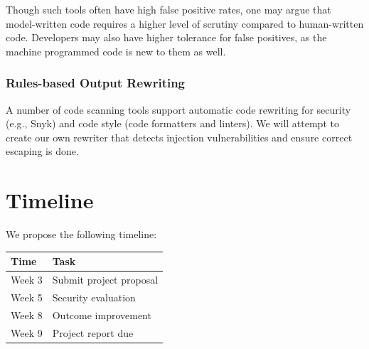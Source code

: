 \documentclass[10pt,sigplan,screen,nonacm]{acmart}
\begin{document}
Though such tools often have high false positive rates, one may argue that model-written code requires a higher level of scrutiny compared to human-written code. Developers may also have higher tolerance for false positives, as the machine programmed code is new to them as well.

\subsubsection{Rules-based Output Rewriting}

A number of code scanning tools support automatic code rewriting for security (e.g., Snyk) and code style (code formatters and linters). We will attempt to create our own rewriter that detects injection vulnerabilities and ensure correct escaping is done.

\section{Timeline}

We propose the following timeline:

\begin{center}
    \begin{tabular}{@{}ll@{}} \toprule
        Time & Task \\ \midrule
        Week 3 & Submit project proposal \\
        Week 5 & Security evaluation \\
        Week 8 & Outcome improvement \\
        Week 9 & Project report due \\
        \bottomrule
    \end{tabular}
\end{center}



\end{document}
